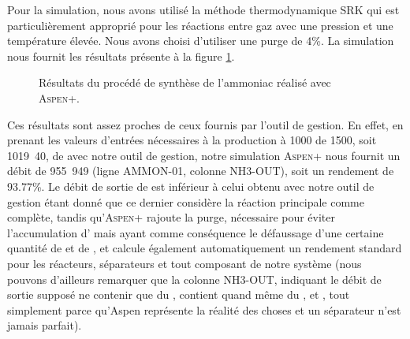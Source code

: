 Pour la simulation, nous avons utilisé la méthode
thermodynamique \textsc{SRK} qui est particulièrement
approprié pour les réactions entre gaz avec une pression
et une température élevée. Nous avons choisi d'utiliser
une purge de 4\%. La simulation nous fournit les résultats
présente à la figure \ref{fig:resultats-aspen}.

\begin{figure}
	\centering
	\caption{Résultats du procédé de synthèse de l'ammoniac
	réalisé avec \textsc{Aspen+}.}
	\label{fig:resultats-aspen}
\end{figure}

Ces résultats sont assez proches de ceux fournis par
l'outil de gestion. En effet, en prenant les valeurs
d'entrées nécessaires à la production à \unit{1000}{\kelvin} de
\unit{1500}{\ton\per\dday}, soit \unit{1019.40}{\mole\per\second},
de  avec notre outil de gestion, notre simulation \textsc{Aspen+}
nous fournit un débit de \unit{955.949}{\mole\per\second} (ligne AMMON-01, colonne NH3-OUT),
soit un rendement de 93.77\%. Le débit de sortie de 
est inférieur à celui obtenu avec notre outil de gestion étant donné que
ce dernier considère la réaction principale comme complète, tandis qu'\textsc{Aspen+}
rajoute la purge, nécessaire pour éviter l'accumulation d'
mais ayant comme conséquence le défaussage d'une certaine quantité de
 et de , et calcule également automatiquement un rendement
standard pour les réacteurs, séparateurs et tout composant de notre système
(nous pouvons d'ailleurs remarquer que la colonne NH3-OUT, indiquant le débit
de sortie supposé ne contenir que du , contient quand même du 
,  et , 
tout simplement parce qu'Aspen représente la réalité des choses et 
un séparateur n'est jamais parfait).

